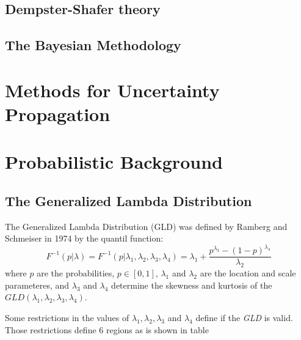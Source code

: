 \subsection{Dempster-Shafer theory}

\subsection{The Bayesian Methodology}

\section{Methods for Uncertainty Propagation}

\section{Probabilistic Background}
\subsection{The Generalized Lambda Distribution}
The Generalized Lambda Distribution (GLD) was defined by Ramberg and Schmeiser in 1974 by the quantil function:
\begin{equation}
F^{-1}(p|\lambda)=F^{-1}(p|\lambda_{1}, \lambda_{2}, \lambda_{3}, \lambda_{4})=\lambda_{1}+\frac{p^{\lambda_{3}}-(1-p)^{\lambda_{4}}}{\lambda_{2}}
\end{equation}
where $p$ are the probabilities, $p\in[0,1]$, $\lambda_{1}$ and $\lambda_{2}$ are the location and scale parameteres, and $\lambda_{3}$ and $\lambda_{4}$ determine the skewness and kurtosis of the $GLD(\lambda_{1}, \lambda_{2}, \lambda_{3}, \lambda_{4})$.

Some restrictions in the values of $\lambda_{1}, \lambda_{2}, \lambda_{3}$ and  $\lambda_{4}$ define if the \textit{GLD} is valid. Those restrictions define 6 regions as is shown in table 

